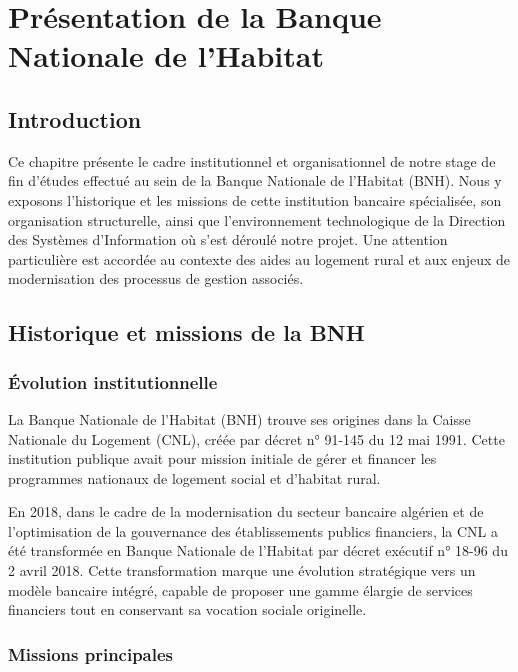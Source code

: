 \chapter{Présentation de la Banque Nationale de l'Habitat}
\clearpage
\label{chap:presentation}

\section{Introduction}

Ce chapitre présente le cadre institutionnel et organisationnel de notre stage de fin d'études effectué au sein de la Banque Nationale de l'Habitat (BNH). Nous y exposons l'historique et les missions de cette institution bancaire spécialisée, son organisation structurelle, ainsi que l'environnement technologique de la Direction des Systèmes d'Information où s'est déroulé notre projet. Une attention particulière est accordée au contexte des aides au logement rural et aux enjeux de modernisation des processus de gestion associés.

\section{Historique et missions de la BNH}

\subsection{Évolution institutionnelle}

La Banque Nationale de l'Habitat (BNH) trouve ses origines dans la Caisse Nationale du Logement (CNL), créée par décret n° 91-145 du 12 mai 1991. Cette institution publique avait pour mission initiale de gérer et financer les programmes nationaux de logement social et d'habitat rural.

\medskip

En 2018, dans le cadre de la modernisation du secteur bancaire algérien et de l'optimisation de la gouvernance des établissements publics financiers, la CNL a été transformée en Banque Nationale de l'Habitat par décret exécutif n° 18-96 du 2 avril 2018. Cette transformation marque une évolution stratégique vers un modèle bancaire intégré, capable de proposer une gamme élargie de services financiers tout en conservant sa vocation sociale originelle.

\subsection{Missions principales}

